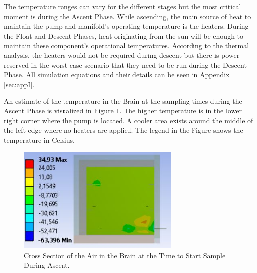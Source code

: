 \documentclass[a4paper,12pt,twoside]{article}
\begin{document}
The temperature ranges can vary for the different stages but the most critical moment is during the Ascent Phase. While ascending, the main source of heat to maintain the pump and manifold's operating temperature is the heaters. During the Float and Descent Phases, heat originating from the sun will be enough to maintain these component's operational temperatures. According to the thermal analysis, the heaters would not be required during descent but there is power reserved in the worst case scenario that they need to be run during the Descent Phase.
All simulation equations and their details can be seen in Appendix \ref{sec:appI}. 

An estimate of the temperature in the Brain at the sampling times during the Ascent Phase is visualized in Figure \ref{fig:Air-in-brain-4-6}. The higher temperature is in the lower right corner where the pump is located. A cooler area exists around the middle of the left edge where no heaters are applied. The legend in the Figure shows the temperature in Celsius.

\begin{figure}[H]
    \centering
    \includegraphics[width=0.7\textwidth]{4-experiment-design/img/Thermal/air-sampling-with-box}
    \caption{Cross Section of the Air in the Brain at the Time to Start Sample During Ascent.}
    \label{fig:Air-in-brain-4-6}
\end{figure}
\end{document}
